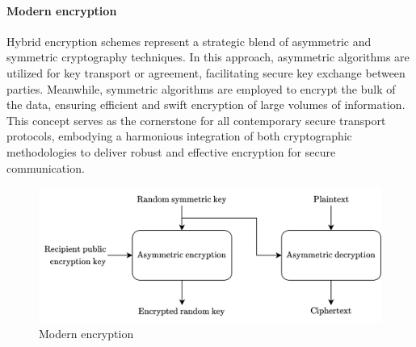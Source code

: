 \paragraph*{Modern encryption}
Hybrid encryption schemes represent a strategic blend of asymmetric and symmetric cryptography techniques.
In this approach, asymmetric algorithms are utilized for key transport or agreement, facilitating secure key exchange between parties. Meanwhile, symmetric algorithms are employed to encrypt the bulk of the data, ensuring efficient and swift encryption of large volumes of information. 
This concept serves as the cornerstone for all contemporary secure transport protocols, embodying a harmonious integration of both cryptographic methodologies to deliver robust and effective encryption for secure communication.
\begin{figure}[H]
    \centering
    \includegraphics[width=0.75\linewidth]{images/menc.png}
    \caption{Modern encryption}
\end{figure}